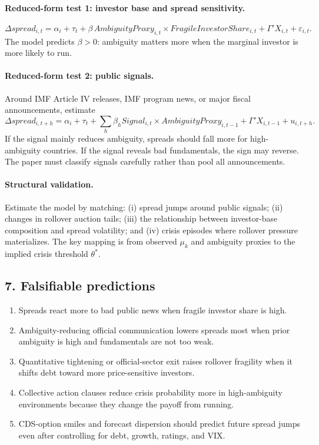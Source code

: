 \documentclass[11pt]{article}
\begin{document}
\paragraph{Reduced-form test 1: investor base and spread sensitivity.}
\begin{equation}
\Delta spread_{i,t}=\alpha_i+\tau_t+\beta\,AmbiguityProxy_{i,t}\times FragileInvestorShare_{i,t}+\Gamma'X_{i,t}+\varepsilon_{i,t}. \label{eq:ambig-panel}
\end{equation}
The model predicts $\beta>0$: ambiguity matters more when the marginal investor is more likely to run.

\paragraph{Reduced-form test 2: public signals.} Around IMF Article IV releases, IMF program news, or major fiscal announcements, estimate
\begin{equation}
\Delta spread_{i,t+h}=\alpha_i+\tau_t+\sum_h \beta_h Signal_{i,t}\times AmbiguityProxy_{i,t-1}+\Gamma'X_{i,t-1}+u_{i,t+h}. \label{eq:signal-lp}
\end{equation}
If the signal mainly reduces ambiguity, spreads should fall more for high-ambiguity countries. If the signal reveals bad fundamentals, the sign may reverse. The paper must classify signals carefully rather than pool all announcements.

\paragraph{Structural validation.} Estimate the model by matching: (i) spread jumps around public signals; (ii) changes in rollover auction tails; (iii) the relationship between investor-base composition and spread volatility; and (iv) crisis episodes where rollover pressure materializes. The key mapping is from observed $\mu_k$ and ambiguity proxies to the implied crisis threshold $\theta^*$.

\subsection*{7. Falsifiable predictions}
\begin{enumerate}[label=\textbf{P\arabic*.},leftmargin=*]
\item Spreads react more to bad public news when fragile investor share is high.
\item Ambiguity-reducing official communication lowers spreads most when prior ambiguity is high and fundamentals are not too weak.
\item Quantitative tightening or official-sector exit raises rollover fragility when it shifts debt toward more price-sensitive investors.
\item Collective action clauses reduce crisis probability more in high-ambiguity environments because they change the payoff from running.
\item CDS-option smiles and forecast dispersion should predict future spread jumps even after controlling for debt, growth, ratings, and VIX.
\end{enumerate}
\end{document}
